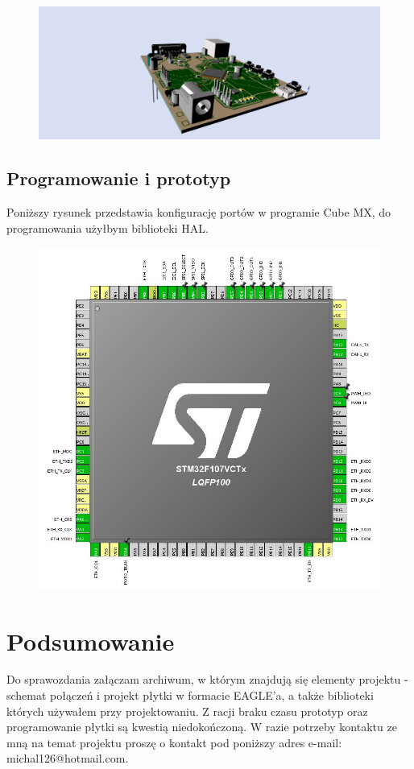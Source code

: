 \documentclass[12pt]{article}
\begin{document}
\begin{figure}[H]
\begin{center}
\includegraphics[width=1\textwidth]{figures/pcb3.png}
\end{center}
\end{figure}

\subsection{Programowanie i prototyp}
Poniższy rysunek przedstawia konfigurację portów w programie Cube MX, do programowania użyłbym biblioteki HAL.
\begin{figure}[H]
\begin{center}
\includegraphics[width=1\textwidth]{figures/cube.jpg}
\end{center}
\end{figure}

\section{Podsumowanie}
Do sprawozdania załączam archiwum, w którym znajdują się elementy projektu - schemat połączeń i projekt płytki w formacie EAGLE'a, a także biblioteki których używałem przy projektowaniu. Z racji braku czasu prototyp oraz programowanie płytki są kwestią niedokończoną. W razie potrzeby kontaktu ze mną na temat projektu proszę o kontakt pod poniższy adres e-mail: michal126@hotmail.com.
\end{document}
